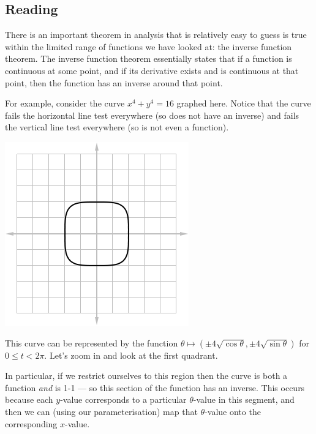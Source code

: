 


\subsection*{Reading}

There is an important theorem in analysis that is relatively easy to guess is true within the limited range of functions we
have looked at: the inverse function theorem. The inverse function theorem essentially states that if a function is continuous
at some point, and if its derivative exists and is continuous at that point, then the function has an inverse around that point.

For example, consider the curve $ x^4 + y^4 = 16$ graphed here. Notice that the curve fails the horizontal line test everywhere (so
does not have an inverse) and fails the vertical line test everywhere (so is not even a function).
\begin{center}
  \includegraphics[width=0.2\linewidth]{implicit15}
\end{center}

This curve can be represented by the function $ \theta \mapsto (\pm4\sqrt{\cos \theta}, \pm4\sqrt{\sin \theta}) $ for $ 0 \leq t < 2\pi $. Let's
zoom in and look at the first quadrant.
\begin{center}
\end{center}
In particular, if we restrict ourselves to this region then the curve is both a function \emph{and} is 1-1 --- so this section of
the function has an inverse. This occurs because each $ y$-value corresponds to a particular $ \theta$-value in this segment, and then
we can (using our parameterisation) map that $ \theta$-value onto the corresponding $ x$-value.


